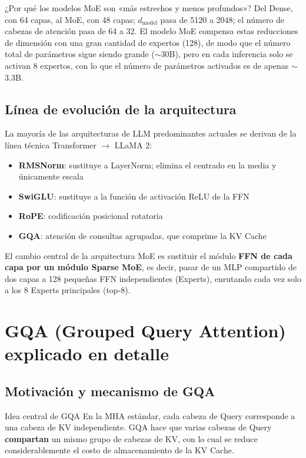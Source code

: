 \documentclass[a4paper]{article}
\begin{document}
\begin{knowledgebox}{¿Por qué los modelos MoE son «más estrechos y menos profundos»?}
Del Dense, con 64 capas, al MoE, con 48 capas; $d_{\text{model}}$ pasa de 5120 a 2048; el número de cabezas de atención pasa de 64 a 32. El modelo MoE compensa estas reducciones de dimensión con una gran cantidad de expertos (128), de modo que el número total de parámetros sigue siendo grande ($\sim$30B), pero en cada inferencia solo se activan 8 expertos, con lo que el número de parámetros activados es de apenas $\sim$3.3B.
\end{knowledgebox}

\subsection{Línea de evolución de la arquitectura}

La mayoría de las arquitecturas de LLM predominantes actuales se derivan de la línea técnica Transformer $\to$ LLaMA 2:

\begin{itemize}
  \item \textbf{RMSNorm}: sustituye a LayerNorm; elimina el centrado en la media y únicamente escala
  \item \textbf{SwiGLU}: sustituye a la función de activación ReLU de la FFN
  \item \textbf{RoPE}: codificación posicional rotatoria
  \item \textbf{GQA}: atención de consultas agrupadas, que comprime la KV Cache
\end{itemize}

El cambio central de la arquitectura MoE es sustituir el módulo \textbf{FFN de cada capa por un módulo Sparse MoE}, es decir, pasar de un MLP compartido de dos capas a 128 pequeñas FFN independientes (Experts), enrutando cada vez solo a los 8 Experts principales (top-8).
\section{GQA (Grouped Query Attention) explicado en detalle}

\subsection{Motivación y mecanismo de GQA}

\begin{importantbox}{Idea central de GQA}
En la MHA estándar, cada cabeza de Query corresponde a una cabeza de KV independiente. GQA hace que varias cabezas de Query \textbf{compartan} un mismo grupo de cabezas de KV, con lo cual se reduce considerablemente el costo de almacenamiento de la KV Cache.
\end{importantbox}
\end{document}

